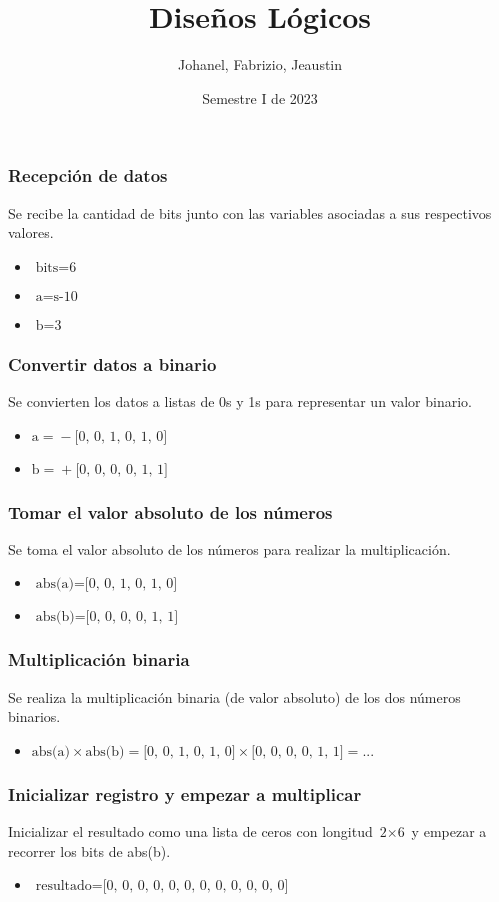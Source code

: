 \documentclass{beamer}
\title{Diseños Lógicos}
\author{Johanel, Fabrizio, Jeaustin}
\institute{Tecnológico de Costa Rica}
\date{Semestre I de 2023}
\begin{document}
\begin{frame}
\frametitle{Recepción de datos}
Se recibe la cantidad de bits junto con las variables asociadas a sus respectivos valores.
\begin{itemize}
\item $\text{bits}=\text{6}$
\item $\text{a}=\text{s-10}$
\item $\text{b}=\text{3}$
\end{itemize}
\end{frame}
\begin{frame}
\frametitle{Convertir datos a binario}
Se convierten los datos a listas de 0s y 1s para representar un valor binario.
\begin{itemize}
\item $\text{a}=\text{}-\text{[0, 0, 1, 0, 1, 0]}$
\item $\text{b}=\text{}+\text{[0, 0, 0, 0, 1, 1]}$
\end{itemize}
\end{frame}
\begin{frame}
\frametitle{Tomar el valor absoluto de los números}
Se toma el valor absoluto de los números para realizar la multiplicación.
\begin{itemize}
\item $\text{abs(a)}=\text{[0, 0, 1, 0, 1, 0]}$
\item $\text{abs(b)}=\text{[0, 0, 0, 0, 1, 1]}$
\end{itemize}
\end{frame}
\begin{frame}
\frametitle{Multiplicación binaria}
Se realiza la multiplicación binaria (de valor absoluto) de los dos números binarios.
\begin{itemize}
\item $\text{abs(a)}\times\text{abs(b)}=\text{[0, 0, 1, 0, 1, 0]}\times\text{[0, 0, 0, 0, 1, 1]}=\text{...}$
\end{itemize}
\end{frame}
\begin{frame}
\frametitle{Inicializar registro y empezar a multiplicar}
Inicializar el resultado como una lista de ceros con longitud $\text{2}\times\text{6}$ y empezar a recorrer los bits de abs(b).
\begin{itemize}
\item $\text{resultado}=\text{[0, 0, 0, 0, 0, 0, 0, 0, 0, 0, 0, 0]}$
\end{itemize}
\end{frame}
\end{document}
